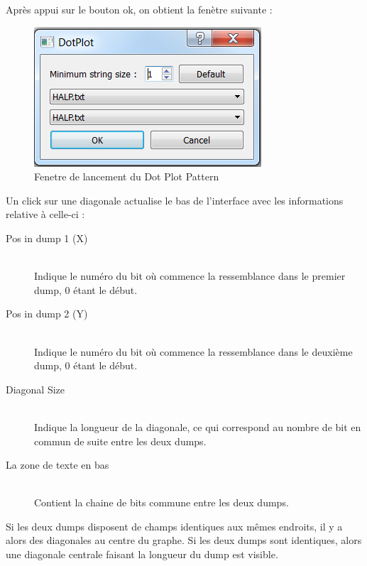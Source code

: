 Après appui sur le bouton ok, on obtient la fenètre suivante :
\begin{figure}[!h]
  \begin{center}
  \includegraphics[width=\textwidth]{dotplotdialog.png}
  \caption{Fenetre de lancement du Dot Plot Pattern}
  \label{dotplotdialog}
  \end{center}
\end{figure}

Un click sur une diagonale actualise le bas de l'interface avec les informations relative à celle-ci :
\begin{description}
\item[Pos in dump 1 (X)] \hfill \\
	Indique le numéro du bit où commence la ressemblance dans le premier dump, 0 étant le début.
	
\item[Pos in dump 2 (Y)] \hfill \\
	Indique le numéro du bit où commence la ressemblance dans le deuxième dump, 0 étant le début.

\item[Diagonal Size] \hfill \\
	Indique la longueur de la diagonale, ce qui correspond au nombre de bit en commun de suite entre les deux dumps.
	
\item[La zone de texte en bas] \hfill \\
	Contient la chaine de bits commune entre les deux dumps.

\end{description}

Si les deux dumps disposent de champs identiques aux mêmes endroits, il y a alors des diagonales au centre du graphe. Si les deux dumps sont identiques, alors une diagonale centrale faisant la longueur du dump est visible.